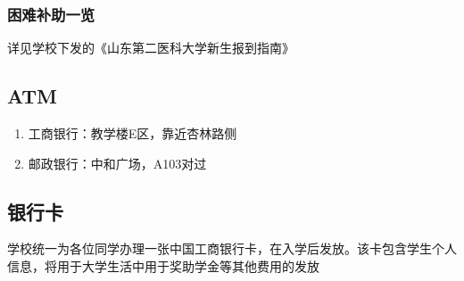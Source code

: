 \subsubsection[困难补助一览]{困难补助一览}
详见学校下发的《山东第二医科大学新生报到指南》

\subsection[ATM]{ATM\footnotemark}
\begin{enumerate}
    \item 工商银行：教学楼E区，靠近杏林路侧
    \item 邮政银行：中和广场，A103对过
\end{enumerate}

\subsection[银行卡]{银行卡}
学校统一为各位同学办理一张中国工商银行卡，在入学后发放。该卡包含学生个人信息，将用于大学生活中用于奖助学金等其他费用的发放

\textbf{}
